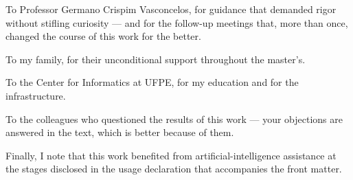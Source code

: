 To Professor Germano Crispim Vasconcelos, for guidance that demanded
rigor without stifling curiosity --- and for the follow-up meetings
that, more than once, changed the course of this work for the better.

To my family, for their unconditional support throughout the master's.

To the Center for Informatics at UFPE, for my education and for the
infrastructure.

To the colleagues who questioned the results of this work --- your
objections are answered in the text, which is better because of them.

Finally, I note that this work benefited from artificial-intelligence
assistance at the stages disclosed in the usage declaration that
accompanies the front matter.

